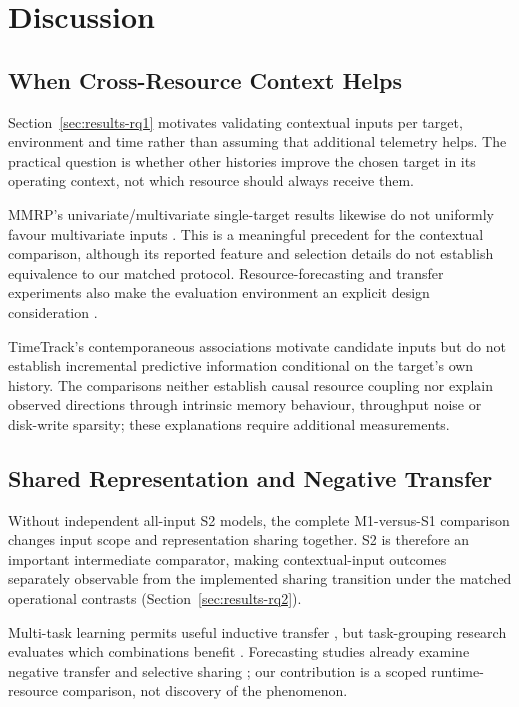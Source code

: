 \documentclass[a4paper,fleqn]{cas-dc}
\begin{document}
\section{Discussion}
\label{sec:discussion}

\subsection{When Cross-Resource Context Helps}
\label{sec:discussion-context}

Section~\ref{sec:results-rq1} motivates validating contextual inputs per
target, environment and time rather than assuming that additional telemetry
helps. The practical question is whether other histories improve the chosen
target in its operating context, not which resource should always receive them.

MMRP's univariate/multivariate single-target results likewise do not uniformly
favour multivariate inputs \citep{Tripathi2025MMRP}. This is a meaningful
precedent for the contextual comparison, although its reported feature and
selection details do not establish equivalence to our matched protocol.
Resource-forecasting and transfer experiments also make the evaluation
environment an explicit design consideration \citep{Rossi2025CloudUncertainty}.

TimeTrack's contemporaneous associations \citep{Meliani2025TimeTrack}
motivate candidate inputs but do not establish incremental predictive
information conditional on the target's own history. The comparisons neither
establish causal resource coupling nor explain observed directions through
intrinsic memory behaviour, throughput noise or disk-write sparsity; these
explanations require additional measurements.

\subsection{Shared Representation and Negative Transfer}
\label{sec:discussion-sharing}

Without independent all-input S2 models, the complete M1-versus-S1 comparison
changes input scope and representation sharing together. S2 is therefore an
important intermediate comparator, making contextual-input outcomes separately
observable from the implemented sharing transition under the matched
operational contrasts (Section~\ref{sec:results-rq2}).

Multi-task learning permits useful inductive transfer
\citep{Caruana1997Multitask}, but task-grouping research evaluates which
combinations benefit \citep{Standley2020TaskGrouping,Fifty2021TaskGroupings}.
Forecasting studies already examine negative transfer and selective sharing
\citep{Nikentari2022NARMAXLSTM,Nochumsohn2025MTLinear}; our contribution is a
scoped runtime-resource comparison, not discovery of the phenomenon.
\end{document}
